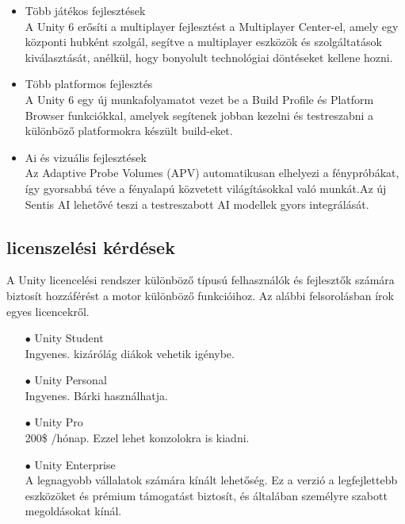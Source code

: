 \documentclass[
]{thesis-ekf}
\theoremstyle{definition}
\theoremstyle{remark}
\begin{document}
\begin{itemize}
\begin{itemize}
		\item Több játékos fejlesztések \\A  Unity 6 erősíti a multiplayer fejlesztést a Multiplayer Center-el, amely egy központi hubként szolgál, segítve a multiplayer eszközök és szolgáltatások kiválasztását, anélkül, hogy bonyolult technológiai döntéseket kellene hozni.
		\item Több platformos fejlesztés \\A Unity 6 egy új munkafolyamatot vezet be a Build Profile és Platform Browser funkciókkal, amelyek segítenek jobban kezelni és testreszabni a különböző platformokra készült build-eket.
		\item Ai és vizuális fejlesztések \\Az Adaptive Probe Volumes (APV) automatikusan elhelyezi a fénypróbákat, így gyorsabbá téve a fényalapú közvetett világításokkal való munkát.Az új Sentis AI lehetővé teszi a testreszabott AI modellek gyors integrálását.\cite{Unity6}
	\end{itemize}
\end{itemize}
\subsection{licenszelési kérdések}
A Unity licencelési rendszer különböző típusú felhasználók és fejlesztők számára biztosít hozzáférést a motor különböző funkcióihoz. Az alábbi felsorolásban írok egyes licencekről.
\begin{itemize}
	\item[$\bullet$] Unity Student \\ Ingyenes. kizárólág diákok vehetik igénybe.
	\item[$\bullet$] Unity Personal\\ Ingyenes. Bárki használhatja.
	\item[$\bullet$] Unity Pro\\200\$ /hónap. Ezzel lehet konzolokra is kiadni.
	\item[$\bullet$] Unity Enterprise\\A legnagyobb vállalatok számára kínált lehetőség. Ez a verzió a legfejlettebb eszközöket és prémium támogatást biztosít, és általában személyre szabott megoldásokat kínál.\cite{UnityLicences}
\end{itemize}
\end{document}
